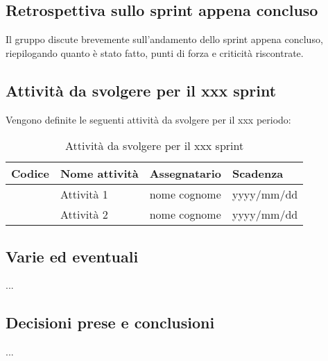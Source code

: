 \documentclass[italian,12pt]{article}
\begin{document}
\subsection{Retrospettiva sullo sprint appena concluso}
Il gruppo discute brevemente sull'andamento dello sprint appena concluso, riepilogando quanto è stato fatto, punti di forza e criticità riscontrate. %

\subsection{Attività da svolgere per il xxx sprint} %
Vengono definite le seguenti attività da svolgere per il xxx periodo: %

\begin{table}[!h]
	\centering
	\begin{tabular}{ |l||l|l|l| }
		\hline
		\textbf{Codice} & \textbf{Nome attività} & \textbf{Assegnatario} & \textbf{Scadenza} \\
		\hline
		\mySkip[86bz7hfte]       & Attività 1             & nome cognome        & yyyy/mm/dd \\
		\mySkip[86bz7hfte]       & Attività 2             & nome cognome        & yyyy/mm/dd \\
		\hline
	\end{tabular}
	\caption{Attività da svolgere per il xxx sprint} %
\end{table}

\subsection{Varie ed eventuali}
...

\subsection{Decisioni prese e conclusioni}
...
\end{document}
